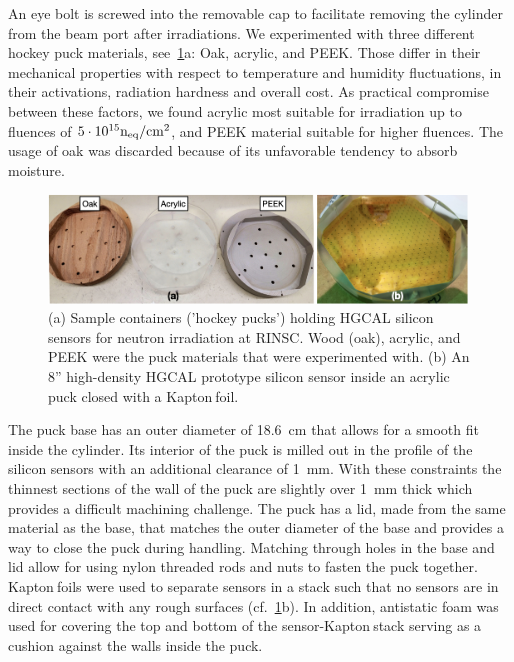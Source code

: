 An eye bolt is screwed into the removable cap to facilitate removing the cylinder from the beam port after irradiations.
We experimented with three different hockey puck materials, see~\ref{fig:Pucks_Arrayed}a: Oak, acrylic, and PEEK. 
Those differ in their mechanical properties with respect to temperature and humidity fluctuations, in their activations, radiation hardness and overall cost.
As practical compromise between these factors, we found acrylic most suitable for irradiation up to fluences of $5\cdot 10^{15}\mathrm{n_{eq}}/\mathrm{cm}^{2}$, and PEEK material suitable for higher fluences. 
The usage of oak was discarded because of its unfavorable tendency to absorb moisture.
\begin{figure}[!hbt]
  \begin{center}
    \includegraphics[width=0.99\textwidth]{figures/figures_edited_002.jpeg}
    \caption{(a) Sample containers ('hockey pucks') holding HGCAL silicon sensors for neutron irradiation at RINSC. 
    Wood (oak), acrylic, and PEEK were the puck materials that were experimented with.
    (b) An 8'' high-density HGCAL prototype silicon sensor inside an acrylic puck closed with a Kapton\texttrademark$~$foil.}
    \label{fig:Pucks_Arrayed}
  \end{center}
\end{figure}
The puck base has an outer diameter of \SI{18.6}{\centi\metre} that allows for a smooth fit inside the cylinder. 
Its interior of the puck is milled out in the profile of the silicon sensors with an additional clearance of \SI{1}{\milli\metre}. 
With these constraints the thinnest sections of the wall of the puck are slightly over \SI{1}{\milli\metre} thick which provides a difficult machining challenge.
The puck has a lid, made from the same material as the base, that matches the outer diameter of the base and provides a way to close the puck during handling.
Matching through holes in the base and lid allow for using nylon threaded rods and nuts to fasten the puck together. 
Kapton\texttrademark$~$foils were used to separate sensors in a stack such that no sensors are in direct contact with any rough surfaces (cf.~\ref{fig:Pucks_Arrayed}b).
In addition, antistatic foam was used for covering the top and bottom of the sensor-Kapton\texttrademark$~$stack serving as a cushion  against the walls inside the puck.
